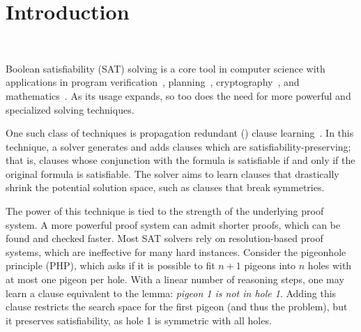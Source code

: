 \section{Introduction}~\label{sec:intro}


Boolean satisfiability (SAT) solving is a core tool in computer science with
applications in program
verification~\cite{BillionQueries,sat-hardwareverification,ic3,bmc},
planning~\cite{planning,planningassat}, cryptography~\cite{cryptominisat}, and
mathematics~\cite{chromaticnumber,pythagoreantriples,kellersconjecture,emptyhexagon}.
As its usage expands, so too does the need for more powerful and specialized
solving techniques.



One such class of techniques is propagation redundant (\pr) clause
learning~\cite{prclauses}. In this technique, a solver generates and adds
clauses which are satisfiability-preserving; that is, clauses whose conjunction
with the formula is satisfiable if and only if the original formula is
satisfiable. The solver aims to learn clauses that drastically shrink the
potential solution space, such as clauses that break symmetries.




The power of this technique is tied to the strength of the underlying proof
system. A more powerful proof system can admit shorter proofs, which can be
found and checked faster. Most SAT solvers rely on resolution-based proof
systems, which are ineffective for many hard instances. Consider the pigeonhole
principle (PHP), which asks if it is possible to fit $n+1$ pigeons into $n$
holes with at most one pigeon per hole. With a linear number of \pr reasoning
steps, one may learn a \pr clause equivalent to the lemma: \emph{pigeon 1 is not
in hole 1}. Adding this clause restricts the search space for the first pigeon
(and thus the problem), but it preserves satisfiability, as hole 1 is symmetric
with all holes. 

